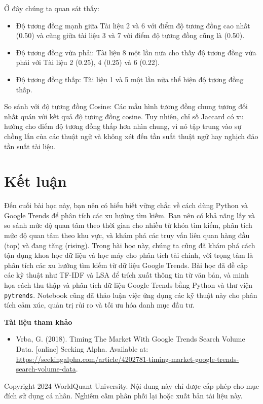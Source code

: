 Ở đây chúng ta quan sát thấy:
\begin{itemize}
  \item Độ tương đồng mạnh giữa Tài liệu 2 và 6 với điểm độ tương đồng cao nhất (0.50) và cũng giữa tài liệu 3 và 7 với điểm độ tương đồng cũng là (0.50).
  \item Độ tương đồng vừa phải: Tài liệu 8 một lần nữa cho thấy độ tương đồng vừa phải với Tài liệu 2 (0.25), 4 (0.25) và 6 (0.22).
  \item Độ tương đồng thấp: Tài liệu 1 và 5 một lần nữa thể hiện độ tương đồng thấp.
\end{itemize}

So sánh với độ tương đồng Cosine: Các mẫu hình tương đồng chung tương đối nhất quán với kết quả độ tương đồng cosine. Tuy nhiên, chỉ số Jaccard có xu hướng cho điểm độ tương đồng thấp hơn nhìn chung, vì nó tập trung vào sự chồng lấn của các thuật ngữ và không xét đến tần suất thuật ngữ hay nghịch đảo tần suất tài liệu.

\section*{Kết luận}

Đến cuối bài học này, bạn nên có hiểu biết vững chắc về cách dùng Python và Google Trends để phân tích các xu hướng tìm kiếm. Bạn nên có khả năng lấy và so sánh mức độ quan tâm theo thời gian cho nhiều từ khóa tìm kiếm, phân tích mức độ quan tâm theo khu vực, và khám phá các truy vấn liên quan hàng đầu (top) và đang tăng (rising). Trong bài học này, chúng ta cũng đã khám phá cách tận dụng khoa học dữ liệu và học máy cho phân tích tài chính, với trọng tâm là phân tích các xu hướng tìm kiếm từ dữ liệu Google Trends. Bài học đã đề cập các kỹ thuật như TF-IDF và LSA để trích xuất thông tin từ văn bản, và minh họa cách thu thập và phân tích dữ liệu Google Trends bằng Python và thư viện \texttt{pytrends}. Notebook cũng đã thảo luận việc ứng dụng các kỹ thuật này cho phân tích cảm xúc, quản trị rủi ro và tối ưu hóa danh mục đầu tư.

\textbf{Tài liệu tham khảo}

\begin{itemize}
  \item Vrba, G. (2018). Timing The Market With Google Trends Search Volume Data. [online] Seeking Alpha. Available at: \url{https://seekingalpha.com/article/4202781-timing-market-google-trends-search-volume-data}.
\end{itemize}

\begin{center}
\small Copyright 2024 WorldQuant University. Nội dung này chỉ được cấp phép cho mục đích sử dụng cá nhân. Nghiêm cấm phân phối lại hoặc xuất bản tài liệu này.
\end{center}
